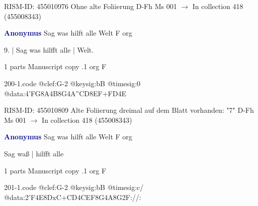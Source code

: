 \documentclass[twocolumn]{book}
\begin{document}
\newline RISM-ID: 455010976
\newline Ohne alte Foliierung
\newline D-Fh  Ms 001
\newline $\rightarrow$ In collection 418 (455008343)

\newline \par \vspace{7pt} \textcolor{darkblue}{\textbf{Anonymus  }}
\newline Sag was hilft alle Welt  F  
\newline org
\newline \begin{itshape}[f.7r, at left:] 9. | Sag was hilfft alle | Welt.\end{itshape} 
\newline \textcolor{darkblue}{}  1 parts  
\newline Manuscript copy
.1  org  F  
\begin{filecontents*}{200-1.code}
@clef:G-2
@keysig:bB
@timesig:0
@data:4'FG8A4B8G4A''CD{8EF+}{FD}4E
\end{filecontents*}
\newline
%

\newline RISM-ID: 455010809
\newline Alte Foliierung dreimal auf dem Blatt vorhanden: "7"
\newline D-Fh  Ms 001
\newline $\rightarrow$ In collection 418 (455008343)

\newline \par \vspace{7pt} \textcolor{darkblue}{\textbf{Anonymus  }}
\newline Sag was hilft alle Welt  F  
\newline org
\newline \begin{itshape}[f.42v, at left:] Sag waß | hilfft alle\end{itshape} 
\newline \textcolor{darkblue}{}  1 parts  
\newline Manuscript copy
.1  org  F  
\begin{filecontents*}{201-1.code}
@clef:G-2
@keysig:bB
@timesig:c/
@data:2'F4E{8DxC+}{CD}4CEF8G4A8G2F://:
\end{filecontents*}
\newline
%
\end{document}
